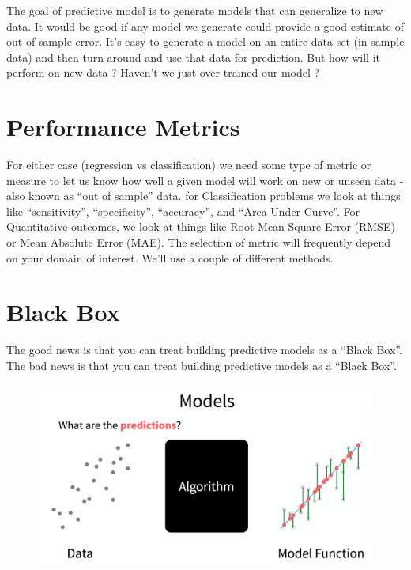 \documentclass[]{book}
\begin{document}
The goal of predictive model is to generate models that can generalize
to new data. It would be good if any model we generate could provide a
good estimate of out of sample error. It's easy to generate a model on
an entire data set (in sample data) and then turn around and use that
data for prediction. But how will it perform on new data ? Haven't we
just over trained our model ?

\section{Performance Metrics}\label{performance-metrics}

For either case (regression vs classification) we need some type of
metric or measure to let us know how well a given model will work on new
or unseen data - also known as ``out of sample'' data. for
Classification problems we look at things like ``sensitivity'',
``specificity'', ``accuracy'', and ``Area Under Curve''. For
Quantitative outcomes, we look at things like Root Mean Square Error
(RMSE) or Mean Absolute Error (MAE). The selection of metric will
frequently depend on your domain of interest. We'll use a couple of
different methods.

\section{Black Box}\label{black-box}

The good news is that you can treat building predictive models as a
``Black Box''. The bad news is that you can treat building predictive
models as a ``Black Box''.

\begin{figure}
\centering
\includegraphics{./PICS/black_box.png}
\caption{}
\end{figure}
\end{document}
